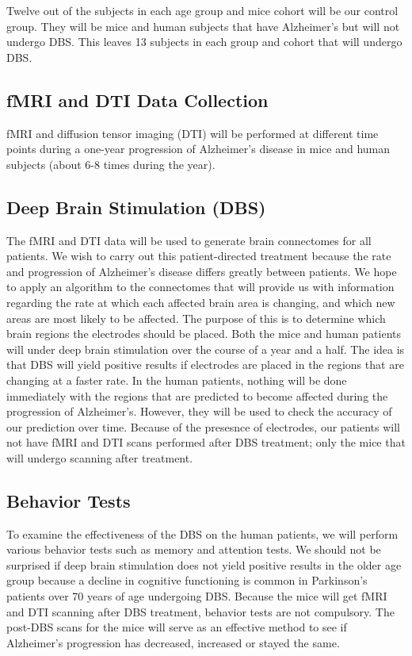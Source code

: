 \documentclass{article}
\begin{document}
Twelve out of the subjects in each age group and mice cohort will be our control group. They will be mice and human subjects that have Alzheimer's but will not undergo DBS. This leaves 13 subjects in each group and cohort that will undergo DBS.

\subsection{fMRI and DTI Data Collection}
fMRI and diffusion tensor imaging (DTI) will be performed at different time points during a one-year progression of Alzheimer's disease in mice and human subjects (about 6-8 times during the year).

\subsection{Deep Brain Stimulation (DBS)}
The fMRI and DTI data will be used to generate brain connectomes for all patients. We wish to carry out this patient-directed treatment because the rate and progression of Alzheimer's disease differs greatly between patients. We hope to apply an algorithm to the connectomes that will provide us with information regarding the rate at which each affected brain area is changing, and which new areas are most likely to be affected. The purpose of this is to determine which brain regions the electrodes should be placed. Both the mice and human patients will under deep brain stimulation over the course of a year and a half. The idea is that DBS will yield positive results if electrodes are placed in the regions that are changing at a faster rate. In the human patients, nothing will be done immediately with the regions that are predicted to become affected during the progression of Alzheimer's. However, they will be used to check the accuracy of our prediction over time. Because of the presesnce of electrodes, our patients will not have fMRI and DTI scans performed after DBS treatment; only the mice that will undergo scanning after treatment.

\subsection{Behavior Tests}
To examine the effectiveness of the DBS on the human patients, we will perform various behavior tests such as memory and attention tests. We should not be surprised if deep brain stimulation does not yield positive results in the older age group because a decline in cognitive functioning is common in Parkinson's patients over 70 years of age undergoing DBS.
Because the mice will get fMRI and DTI scanning after DBS treatment, behavior tests are not compulsory. The post-DBS scans for the mice will serve as an effective method to see if Alzheimer's progression has decreased, increased or stayed the same.
\end{document}
